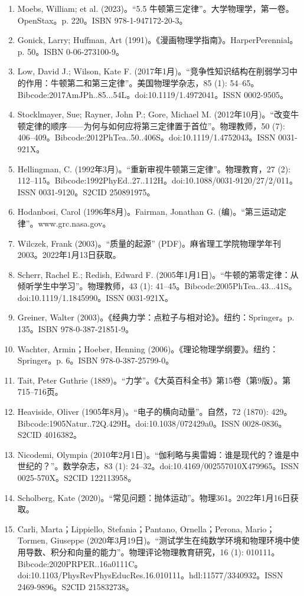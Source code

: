\begin{enumerate}
\item Moebs, William; et al. (2023)。“5.5 牛顿第三定律”。大学物理学，第一卷。OpenStax。p. 220。ISBN 978-1-947172-20-3。
\item Gonick, Larry; Huffman, Art (1991)。《漫画物理学指南》。HarperPerennial。p. 50。ISBN 0-06-273100-9。
\item Low, David J.; Wilson, Kate F. (2017年1月)。“竞争性知识结构在削弱学习中的作用：牛顿第二和第三定律”。美国物理学杂志，85 (1): 54–65。Bibcode:2017AmJPh..85...54L。doi:10.1119/1.4972041。ISSN 0002-9505。
\item Stocklmayer, Sue; Rayner, John P.; Gore, Michael M. (2012年10月)。“改变牛顿定律的顺序——为何与如何应将第三定律置于首位”。物理教师，50 (7): 406–409。Bibcode:2012PhTea..50..406S。doi:10.1119/1.4752043。ISSN 0031-921X。
\item Hellingman, C. (1992年3月)。“重新审视牛顿第三定律”。物理教育，27 (2): 112–115。Bibcode:1992PhyEd..27..112H。doi:10.1088/0031-9120/27/2/011。ISSN 0031-9120。S2CID 250891975。
\item Hodanbosi, Carol (1996年8月)。Fairman, Jonathan G. (编)。“第三运动定律”。www.grc.nasa.gov。
\item Wilczek, Frank (2003)。“质量的起源” (PDF)。麻省理工学院物理学年刊2003。2022年1月13日获取。
\item Scherr, Rachel E.; Redish, Edward F. (2005年1月1日)。“牛顿的第零定律：从倾听学生中学习”。物理教师，43 (1): 41–45。Bibcode:2005PhTea..43...41S。doi:10.1119/1.1845990。ISSN 0031-921X。
\item Greiner, Walter (2003)。《经典力学：点粒子与相对论》。纽约：Springer。p. 135。ISBN 978-0-387-21851-9。
\item Wachter, Armin；Hoeber, Henning (2006)。《理论物理学纲要》。纽约：Springer。p. 6。ISBN 978-0-387-25799-0。
\item Tait, Peter Guthrie (1889)。“力学”。《大英百科全书》第15卷（第9版）。第715–716页。
\item Heaviside, Oliver (1905年8月)。“电子的横向动量”。自然，72 (1870): 429。Bibcode:1905Natur..72Q.429H。doi:10.1038/072429a0。ISSN 0028-0836。S2CID 4016382。
\item Nicodemi, Olympia (2010年2月1日)。“伽利略与奥雷姆：谁是现代的？谁是中世纪的？”。数学杂志，83 (1): 24–32。doi:10.4169/002557010X479965。ISSN 0025-570X。S2CID 122113958。
\item Scholberg, Kate (2020)。“常见问题：抛体运动”。物理361。2022年1月16日获取。
\item Carli, Marta；Lippiello, Stefania；Pantano, Ornella；Perona, Mario；Tormen, Giuseppe (2020年3月19日)。“测试学生在纯数学环境和物理环境中使用导数、积分和向量的能力”。物理评论物理教育研究，16 (1): 010111。Bibcode:2020PRPER..16a0111C。doi:10.1103/PhysRevPhysEducRes.16.010111。hdl:11577/3340932。ISSN 2469-9896。S2CID 215832738。

\end{enumerate}
